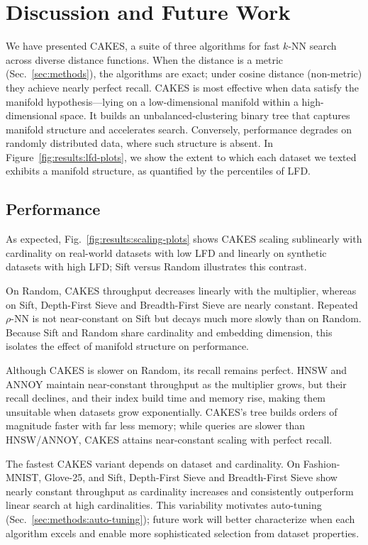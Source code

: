 \section{Discussion and Future Work}
\label{sec:discussion-and-future-work}

We have presented CAKES, a suite of three algorithms for fast $k$-NN search across diverse distance functions. When the distance is a metric (Sec.~\ref{sec:methods}), the algorithms are exact; under cosine distance (non-metric) they achieve nearly perfect recall. CAKES is most effective when data satisfy the manifold hypothesis—lying on a low-dimensional manifold within a high-dimensional space. It builds an unbalanced-clustering binary tree that captures manifold structure and accelerates search. Conversely, performance degrades on randomly distributed data, where such structure is absent. In Figure~\ref{fig:results:lfd-plots}, we show the extent to which each dataset we texted exhibits a manifold structure, as quantified by the percentiles of LFD.  


\subsection{Performance}

As expected, Fig.~\ref{fig:results:scaling-plots} shows CAKES scaling sublinearly with cardinality on real-world datasets with low LFD and linearly on synthetic datasets with high LFD; Sift versus Random illustrates this contrast.

On Random, CAKES throughput decreases linearly with the multiplier, whereas on Sift, Depth-First Sieve and Breadth-First Sieve are nearly constant. Repeated $\rho$-NN is not near-constant on Sift but decays much more slowly than on Random. Because Sift and Random share cardinality and embedding dimension, this isolates the effect of manifold structure on performance.

Although CAKES is slower on Random, its recall remains perfect. HNSW and ANNOY maintain near-constant throughput as the multiplier grows, but their recall declines, and their index build time and memory rise, making them unsuitable when datasets grow exponentially. CAKES’s tree builds orders of magnitude faster with far less memory; while queries are slower than HNSW/ANNOY, CAKES attains near-constant scaling with perfect recall.

The fastest CAKES variant depends on dataset and cardinality. On Fashion-MNIST, Glove-25, and Sift, Depth-First Sieve and Breadth-First Sieve show nearly constant throughput as cardinality increases and consistently outperform linear search at high cardinalities. This variability motivates auto-tuning (Sec.~\ref{sec:methods:auto-tuning}); future work will better characterize when each algorithm excels and enable more sophisticated selection from dataset properties.

